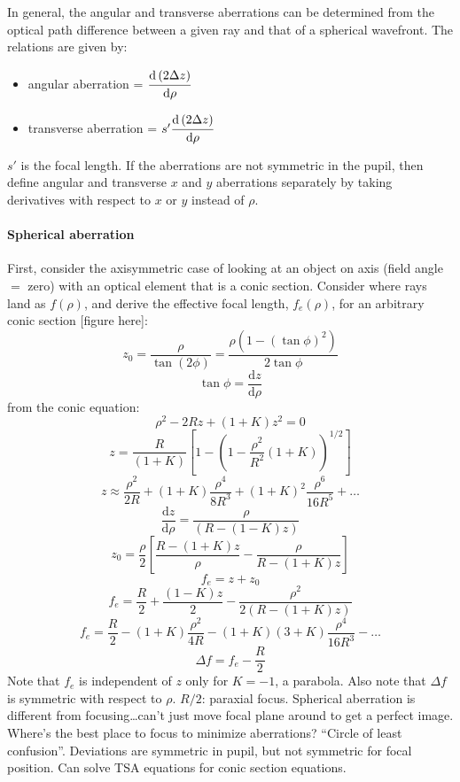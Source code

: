 \documentclass[12pt]{article}
\newcommand{\mynotes}[1]{\textcolor{myBlue}{#1}}
\begin{document}
In general, the angular and transverse aberrations can be determined
from the optical path difference between a given ray and that of a
spherical wavefront. The relations are given by:
\begin{itemize}
    \item angular aberration =
        $\cfrac{\mathrm{d} \left( 2\Delta{z} \right) }{\mathrm{d}\rho}$
    \item transverse aberration =
        $s'\cfrac{\mathrm{d} \left( 2\Delta{z} \right) }{\mathrm{d}\rho}$
\end{itemize}
$s'$ is the focal length. If the aberrations are not symmetric in the pupil,
then define angular and transverse $x$ and $y$ aberrations separately by taking
derivatives with respect to $x$ or $y$ instead of $\rho$.

\paragraph{Spherical aberration}
First, consider the axisymmetric case of looking at an object on axis
(field angle $=$ zero) with an optical element that is a conic
section. Consider where rays land as $f(\rho)$, and derive
the effective focal length, $f_{e}(\rho)$, for an arbitrary conic
section [figure here]:
\[
    z_{0} = \frac{\rho}{\tan(2\phi)} = \frac{\rho(1-(\tan\phi)^{2})}{2\tan\phi}
    \]
\[
    \tan\phi = \frac{\mathrm{d}z}{\mathrm{d}\rho}
    \]
from the conic equation:
\[
    \rho^{2} - 2Rz + (1+K)z^{2} = 0
    \]
\[
    z = \frac{R}{(1+K)} \left[ 1 - \left( 1 - \frac{\rho^{2}}{R^{2}}
    \left( 1 + K \right) \right) ^{1/2} \right]
    \]
\[
    z \approx \frac{\rho^{2}}{2R} + (1 + K)\frac{\rho^{4}}{8R^{3}} +
    (1+K)^{2}\frac{\rho^{6}}{16R^{5}} + \ldots
    \]
\[
    \frac{\mathrm{d}z}{\mathrm{d}\rho} =
    \frac{\rho}{\left(R-\left(1-K\right)z\right)}
    \]
\[
    z_{0} = \frac{\rho}{2}
    \left[\frac{R-(1+K)z}{\rho} - \frac{\rho}{R-(1+K)z}\right]
    \]
\[
    f_{e} = z + z_{0}
    \]
\[
    f_{e} = \frac{R}{2} + \frac{(1-K)z}{2} - \frac{\rho^{2}}{2(R-(1+K)z)}
    \]
\[
    f_{e} = \frac{R}{2} - (1+K)\frac{\rho^{2}}{4R} -
    (1+K)(3+K)\frac{\rho^{4}}{16R^{3}} - \ldots
    \]
\[
    \Delta{f} = f_{e} - \frac{R}{2}
    \]
Note that $f_{e}$ is independent of $z$ only for $K=-1$, a parabola.
Also note that $\Delta{f}$ is symmetric with respect to $\rho$.
\mynotes{%
    $R/2$: paraxial focus. Spherical aberration is different from
    focusing\ldots can't just move focal plane around to get a perfect image.
    Where's the best place to focus to minimize aberrations?
    ``Circle of least confusion''. Deviations are symmetric in pupil,
    but not symmetric for focal position. Can solve TSA equations for
    conic section equations.
}
\end{document}

